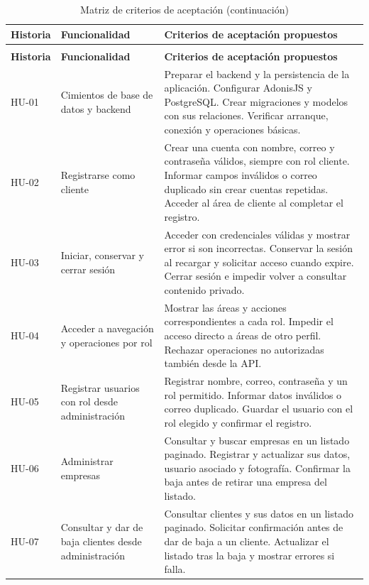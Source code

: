 \begingroup
	\small
	\setlength{\tabcolsep}{4.5pt}
	\renewcommand{\arraystretch}{1.45}
	\begin{longtable}{@{}>{\RaggedRight\arraybackslash}p{1.7cm}>{\RaggedRight\arraybackslash}p{3.9cm}>{\RaggedRight\arraybackslash}p{10.1cm}@{}}
		\caption{Matriz de criterios de aceptación}\label{tab:criterios_tactica}\\
		\toprule
		\textbf{Historia} & \textbf{Funcionalidad} & \textbf{Criterios de aceptación propuestos} \\
		\midrule
		\endfirsthead
		\caption[]{Matriz de criterios de aceptación (continuación)}\\
		\toprule
		\textbf{Historia} & \textbf{Funcionalidad} & \textbf{Criterios de aceptación propuestos} \\
		\midrule
		\endhead
		\endfoot
		\bottomrule
		\endlastfoot
		HU-01 & Cimientos de base de datos y backend & Preparar el backend y la persistencia de la aplicación. Configurar AdonisJS y PostgreSQL. Crear migraciones y modelos con sus relaciones. Verificar arranque, conexión y operaciones básicas. \\ \midrule
		HU-02 & Registrarse como cliente & Crear una cuenta con nombre, correo y contraseña válidos, siempre con rol cliente. Informar campos inválidos o correo duplicado sin crear cuentas repetidas. Acceder al área de cliente al completar el registro. \\ \midrule
		HU-03 & Iniciar, conservar y cerrar sesión & Acceder con credenciales válidas y mostrar error si son incorrectas. Conservar la sesión al recargar y solicitar acceso cuando expire. Cerrar sesión e impedir volver a consultar contenido privado. \\ \midrule
		HU-04 & Acceder a navegación y operaciones por rol & Mostrar las áreas y acciones correspondientes a cada rol. Impedir el acceso directo a áreas de otro perfil. Rechazar operaciones no autorizadas también desde la API. \\ \midrule
		HU-05 & Registrar usuarios con rol desde administración & Registrar nombre, correo, contraseña y un rol permitido. Informar datos inválidos o correo duplicado. Guardar el usuario con el rol elegido y confirmar el registro. \\ \midrule
		HU-06 & Administrar empresas & Consultar y buscar empresas en un listado paginado. Registrar y actualizar sus datos, usuario asociado y fotografía. Confirmar la baja antes de retirar una empresa del listado. \\ \midrule
		HU-07 & Consultar y dar de baja clientes desde administración & Consultar clientes y sus datos en un listado paginado. Solicitar confirmación antes de dar de baja a un cliente. Actualizar el listado tras la baja y mostrar errores si falla. \\ \midrule

\end{longtable}
